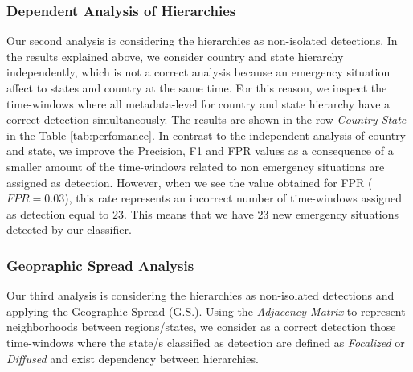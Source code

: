\documentclass[sigconf]{acmart}
\begin{document}
\subsubsection{Dependent Analysis of Hierarchies}
Our second analysis is considering the hierarchies as non-isolated detections. In the results explained above, we consider country and state hierarchy independently, which is not a correct analysis because an emergency situation affect to states and country at the same time. For this reason, we inspect the time-windows where all metadata-level for country and state hierarchy have a correct detection simultaneously. The results are shown in the row \textit{Country-State} in the Table \ref{tab:perfomance}. In contrast to the independent analysis of country and state, we improve the Precision, F1 and FPR values as a consequence of a smaller amount of the time-windows related to non emergency situations are assigned as detection. However, when we see the value obtained for FPR ($FPR = 0.03$), this rate represents an incorrect number of time-windows assigned as detection equal to $23$. This means that we have $23$ new emergency situations detected by our classifier. 


\subsubsection{Geopraphic Spread Analysis}\label{sssec:geospreadanalysis}


Our third analysis is considering the hierarchies as non-isolated detections and applying the Geographic Spread (G.S.). Using the \textit{Adjacency Matrix} to represent neighborhoods between regions/states, we consider as a correct detection those time-windows where the state/s classified as detection are defined as \textit{Focalized} or \textit{Diffused} and exist dependency between hierarchies. 
\end{document}
